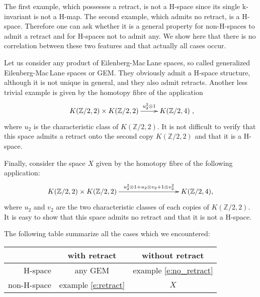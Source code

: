 \documentclass{amsart}
\theoremstyle{definition}
\theoremstyle{remark}
\newcommand{\Z}{\mathbb{Z}}
\begin{document}
The first example, which possesses a retract, is not a H-space since its single k-invariant is not a H-map. The second example, which admits no retract, is a H-space. Therefore one can ask whether it is a general property for non-H-spaces to admit a retract and for H-spaces not to admit any. We show here that there is no correlation between these two features and that actually all cases occur.

Let us consider any product of Eilenberg-Mac\,Lane spaces, so called generalized Eilenberg-Mac\,Lane spaces or GEM. They obviously admit a H-space structure, although it is not unique in general, and they also admit retracts. Another less trivial example is given by the homotopy fibre of the application 
$$\xymatrix{K(\Z/2,2)\times K(\Z/2,2)\ar[r]^-{u_2^2\otimes1}&K(\Z/2,4)},$$
where $u_2$ is the characteristic class of $K(\Z/2,2)$. It is not difficult to verify that this space admits a retract onto the second copy $K(\Z/2,2)$ and that it is a H-space.

Finally, consider the space $X$ given by the homotopy fibre of the following application:
$$\xymatrix@C=3cm{
K(\Z/2,2)\times K(\Z/2,2)\ar[r]^-{u_2^2\otimes1+u_2\otimes v_2+1\otimes v_2^2} &K(\Z/2,4),
}$$ where $u_2$ and $v_2$ are the two characteristic classes of each copies of $K(\Z/2,2)$. It is easy to show that this space admits no retract and that it is not a H-space.

The following table summarize all the cases which we encountered:
\begin{center}
\begin{tabular}{|r|c|c|}
\hline
&with retract &without retract\\
\hline
\hfill H-space &any GEM &example \ref{e:no_retract}\\
\hline
non-H-space &example \ref{e:retract} &$X$\\
\hline
\end{tabular}
\end{center}

\end{document}
